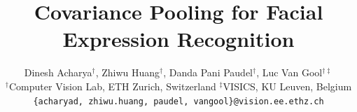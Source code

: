 \documentclass[10pt,twocolumn,letterpaper]{article}
\begin{document}
\title{Covariance Pooling for Facial Expression	Recognition}

\author{Dinesh Acharya$^\dagger$, Zhiwu Huang$^\dagger$, Danda Pani Paudel$^\dagger$, Luc Van Gool$^{\dagger\ddagger}$\\
	$^\dagger$Computer Vision Lab, ETH Zurich, Switzerland \quad $^\ddagger$VISICS, KU Leuven, Belgium\\
{\tt\small \{acharyad, zhiwu.huang, paudel, vangool\}@vision.ee.ethz.ch}
}

\maketitle
\end{document}
